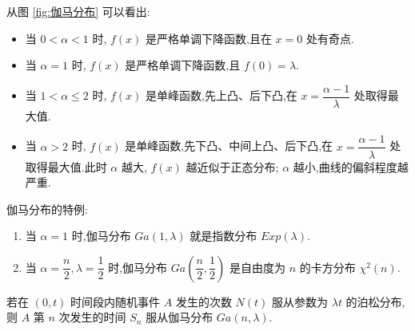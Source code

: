 从图 \ref{fig:伽马分布} 可以看出:
\begin{itemize}
    \item 当 $0 < \alpha < 1$ 时, $f(x)$ 是严格单调下降函数,且在 $x=0$ 处有奇点.
    \item 当 $\alpha = 1$ 时, $f(x)$ 是严格单调下降函数,且 $f(0) = \lambda$.
    \item 当 $1 < \alpha \leqslant 2$ 时, $f(x)$ 是单峰函数,先上凸、后下凸,在 $x = \dfrac{\alpha - 1}{\lambda}$ 处取得最大值.
    \item 当 $\alpha > 2$ 时, $f(x)$ 是单峰函数,先下凸、中间上凸、后下凸,在 $x = \dfrac{\alpha - 1}{\lambda}$ 处取得最大值.此时 $\alpha$ 越大, $f(x)$ 越近似于正态分布; $\alpha$ 越小,曲线的偏斜程度越严重.
\end{itemize}

伽马分布的特例:
\begin{enumerate}
    \item 当 $\alpha = 1$ 时,伽马分布 $Ga(1, \lambda)$ 就是指数分布 $Exp(\lambda)$.
    \item 当 $\alpha = \dfrac{n}{2}, \lambda = \dfrac{1}{2}$ 时,伽马分布 $Ga(\dfrac{n}{2}, \dfrac{1}{2})$ 是自由度为 $n$ 的卡方分布 $\chi^2(n)$.
\end{enumerate}

\begin{conclusion}[][泊松分布与伽马分布的关系]
    \indent 若在 $(0,t)$ 时间段内随机事件 $A$ 发生的次数 $N(t)$ 服从参数为 $\lambda t$ 的泊松分布,则 $A$ 第 $n$ 次发生的时间 $S_n$ 服从伽马分布 $Ga(n, \lambda)$.
\end{conclusion}

